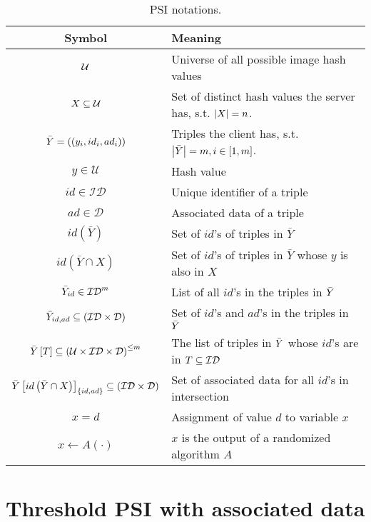 
\begin{table}[t]
\centering
	\begin{tabular}{c l}
\toprule
	

		\textbf{Symbol} & \textbf{Meaning} \\
		\hline
		\hline
		$\mathcal{U}$	& 	Universe of all possible image hash values\\
		$X \subseteq \mathcal{U}$	&Set of distinct hash values the server has, s.t. $\left\lvert X\right\rvert = n$. \\
		$\bar{Y} = \left(\left(y_i, id_i, ad_i \right)\right)$	& Triples the client has, s.t. $\left\lvert\bar{Y}\right\rvert = m, i \in \left[1,m\right]$.	\\
		$y \in \mathcal{U}$	& 	Hash value\\
		$id \in \mathcal{ID}$	& 	Unique identifier of a triple\\
		$ad \in \mathcal{D}$	& 	Associated data of a triple\\
		$id(\bar{Y})$& Set of $id$'s of triples in $\bar{Y}$     \\

		$id(\bar{Y} \cap X)$& Set of $id$'s of triples in $\bar{Y}$ whose $y$ is also in $X$     \\
		$\bar{Y}_{id} \in \mathcal{ID}^{m}$	& List of all $id$'s in the triples in $\bar{Y}$    \\
		$\bar{Y}_{id, ad} \subseteq \left(\mathcal{ID} \times \mathcal{D}\right) $ & Set of $id$'s and $ad$'s in the triples in $\bar{Y}$  \\
		{$\bar{Y} \left[T\right]\subseteq \left(\mathcal{U} \times \mathcal{ID} \times \mathcal{D}\right)^{\leq m} $ }	& The list of triples in $\bar{Y}$ whose $id$'s are in $T \subseteq \mathcal{ID}$  \\
$\bar{Y}\left[id \left(\bar{Y} \cap X\right)\right]_{\left\{id,ad\right\}} \subseteq \left(\mathcal{ID} \times \mathcal{D}\right) $ & Set of associated data for all $id$'s in intersection\\
		$x = d$	&   Assignment of value $d$ to variable $x$  \\
		$x \gets A (\cdot)$	&   $x$ is the output of a randomized algorithm $A$\\
\bottomrule
	\end{tabular}
	\caption{PSI notations.}
	\label{tbl:notation}
\end{table} 


\section{Threshold PSI with associated data} %
\label{sec:threshold_psi_with_associated_data}

